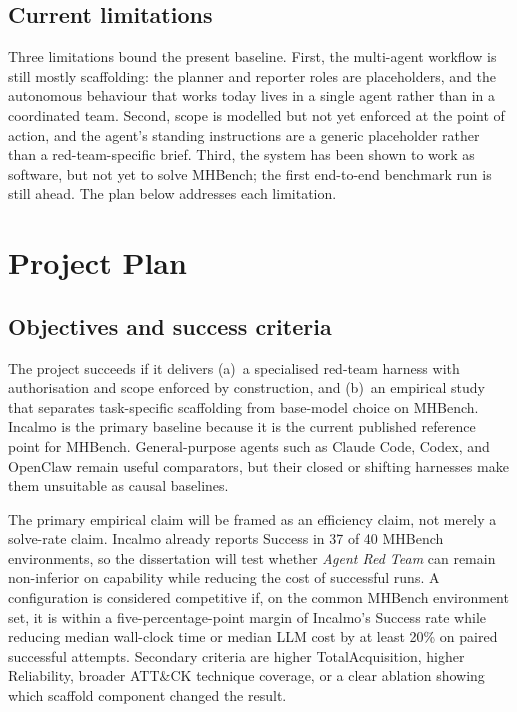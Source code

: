 \documentclass[12pt,oneside]{report}
\begin{document}
\section{Current limitations}
Three limitations bound the present baseline. First, the multi-agent workflow is
still mostly scaffolding: the planner and reporter roles are placeholders, and the
autonomous behaviour that works today lives in a single agent rather than in a
coordinated team. Second, scope is modelled but not yet enforced at the point of
action, and the agent's standing instructions are a generic placeholder rather
than a red-team-specific brief. Third, the system has been shown to work as
software, but not yet to solve MHBench; the first end-to-end benchmark run is
still ahead. The plan below addresses each limitation.

\chapter{Project Plan}
\label{ch:plan}

\section{Objectives and success criteria}
The project succeeds if it delivers (a)~a specialised red-team harness with
authorisation and scope enforced by construction, and (b)~an empirical study that
separates task-specific scaffolding from base-model choice on MHBench. Incalmo is
the primary baseline because it is the current published reference point for
MHBench. General-purpose agents such as Claude Code, Codex, and OpenClaw remain
useful comparators, but their closed or shifting harnesses make them unsuitable
as causal baselines.

The primary empirical claim will be framed as an efficiency claim, not merely a
solve-rate claim. Incalmo already reports Success in 37 of 40 MHBench
environments, so the dissertation will test whether \emph{Agent Red Team} can
remain non-inferior on capability while reducing the cost of successful runs. A
configuration is considered competitive if, on the common MHBench environment
set, it is within a five-percentage-point margin of Incalmo's Success rate while
reducing median wall-clock time or median LLM cost by at least 20\% on paired
successful attempts. Secondary criteria are higher TotalAcquisition, higher
Reliability, broader ATT\&CK technique coverage, or a clear ablation showing
which scaffold component changed the result.
\end{document}
